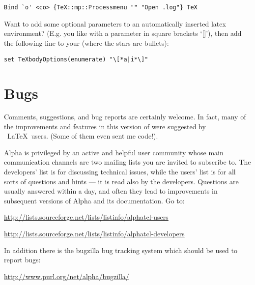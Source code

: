 \documentclass{report}
\begin{document}
\begin{verbatim}
Bind `o' <co> {TeX::mp::Processmenu "" "Open .log"} TeX
\end{verbatim}

Want to add some optional parameters to an automatically inserted
latex environment? (E.g. you like  with a parameter in 
square brackets `[]'), then add the following line to your 
 (where the stars are bullets):

\begin{verbatim}
set TeXbodyOptions(enumerate) "\[*a|i*\]"
\end{verbatim}


\section{Bugs}
\label{sec:bugs}

Comments, suggestions, and bug reports are certainly welcome.  In 
fact, many of the improvements and features in this version of 
 were suggested by \Alpha\ \LaTeX\ users.  (Some of 
them even sent me code!).

Alpha is privileged by an active and helpful user community whose main
communication channels are two mailing lists you are invited to subscribe 
to.  The developers' list is for discussing technical issues, while the users' list
is for all sorts of questions and hints --- it is read also by the developers.
Questions are usually answered within a day, and often they lead to
improvements in subsequent versions of Alpha and its documentation.
Go to:

\url{http://lists.sourceforge.net/lists/listinfo/alphatcl-users}
    
\url{http://lists.sourceforge.net/lists/listinfo/alphatcl-developers}

In addition there is the bugzilla bug tracking system which should be
used to report bugs: 

\url{http://www.purl.org/net/alpha/bugzilla/}
\end{document}
